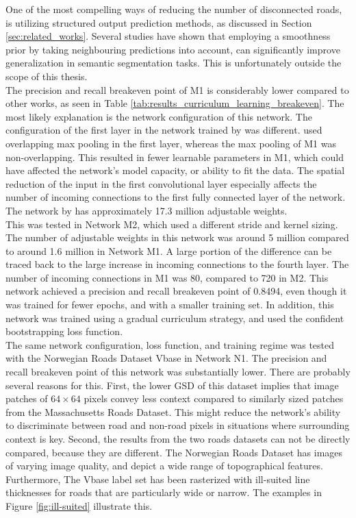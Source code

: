 One of the most compelling ways of reducing the number of disconnected roads, is utilizing structured output prediction methods, as discussed in Section \ref{sec:related_works}. Several studies \citep{Kluckner_semantic_height} \citep{LeCun_semantic} \citep{Mnih_roads_high_res_aerial_images} have shown that employing a smoothness prior by taking neighbouring predictions into account, can significantly improve generalization in semantic segmentation tasks. This is unfortunately outside the scope of this thesis.\\

The precision and recall breakeven point of M1 is considerably lower compared to other works, as seen in Table \ref{tab:results_curriculum_learning_breakeven}. The most likely explanation is the network configuration of this network. The configuration of the first layer in the network trained by \citep{MnihThesis} was different. \citep{MnihThesis} used overlapping max pooling in the first layer, whereas the max pooling of M1 was non-overlapping. This resulted in fewer learnable parameters in M1, which could have affected the network's model capacity, or ability to fit the data. The spatial reduction of the input in the first convolutional layer especially affects the number of incoming connections to the first fully connected layer of the network.  The network by \cite{MnihThesis} has approximately 17.3 million adjustable weights.\\

This was tested in Network M2, which used a different stride and kernel sizing. The number of adjustable weights in this network was around 5 million compared to around 1.6 million in Network M1. A large portion of the difference can be traced back to the large increase in incoming connections to the fourth layer. The number of incoming connections in M1 was 80, compared to 720 in M2. This network achieved a precision and recall breakeven point of 0.8494, even though it was trained for fewer epochs, and with a smaller training set. In addition, this network was trained using a gradual curriculum strategy, and used the confident bootstrapping loss function. \\

The same network configuration, loss function, and training regime was  tested with the Norwegian Roads Dataset Vbase in Network N1. The precision and recall breakeven point of this network was substantially lower. There are probably several reasons for this. First, the lower \ac{GSD} of this dataset implies that image  patches of $64 \times 64$ pixels convey less context compared to similarly sized patches from the Massachusetts Roads Dataset. This might reduce the network's ability to discriminate between road and non-road pixels in situations where surrounding context is key. Second, the results from the two roads datasets can not be directly compared, because they are different. The Norwegian Roads Dataset has images of varying image quality, and depict a wide range of topographical features. Furthermore, The Vbase label set has been rasterized with ill-suited line thicknesses for roads that are particularly wide or narrow. The examples in Figure \ref{fig:ill-suited} illustrate this. 

